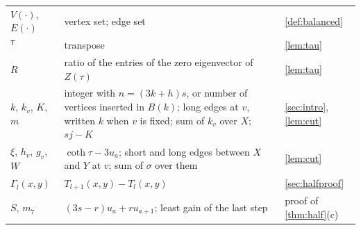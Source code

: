 \documentclass[11pt]{article}
\theoremstyle{definition}
\theoremstyle{remark}
\begin{document}
{\begin{longtable}{l>{\raggedright\arraybackslash}p{}>{\raggedright\arraybackslash}p{}}
$V(\cdot)$, $E(\cdot)$ & vertex set; edge set & \cref{def:balanced}\\
${}^{\mathsf T}$ & transpose & \cref{lem:tau}\\
$R$ & ratio of the entries of the zero eigenvector of $Z(\tau)$ & \cref{lem:tau}\\
$k$, $k_v$, $K$, $m$ & integer with $n=(3k+h)s$, or number of vertices inserted in $B(k)$; long edges at $v$, written $k$ when $v$ is fixed; sum of $k_v$ over $X$; $sj-K$ & \cref{sec:intro}, \cref{lem:cut}\\
$\xi$, $h_v$, $g_v$, $W$ & $\coth\tau-3u_a$; short and long edges between $X$ and $Y$ at $v$; sum of $\sigma$ over them & \cref{lem:cut}\\
$\Gamma_l(x,y)$ & $T_{l+1}(x,y)-T_l(x,y)$ & \cref{sec:halfproof}\\
$S$, $m_7$ & $(3s-r)u_a+ru_{a+1}$; least gain of the last step & proof of \cref{thm:half}(c)\\
\bottomrule
\end{longtable}
}
\end{document}
